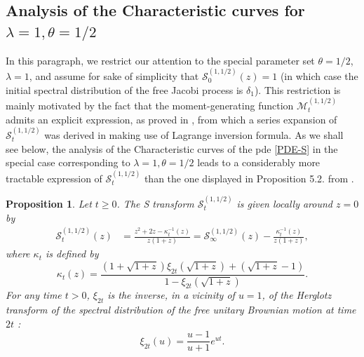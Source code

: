 \documentclass[12pt,reqno]{amsart}
\newtheorem{proposition}{Proposition}
\begin{document}
\subsection{Analysis of the Characteristic curves for \texorpdfstring{$\lambda = 1, \theta=1/2$}{}}
\label{ssec:charcurves}
In this paragraph, we restrict our attention to the special parameter set \(\theta = 1/2\), \(\lambda = 1\), and assume for sake of simplicity that $\mathcal{S}^{(1,1/2)}_0(z) =1$ (in which case the initial spectral distribution of the free Jacobi process is $\delta_1$). This restriction is mainly motivated by the fact that the moment-generating function $\mathcal{M}_t^{(1,1/2)}$
admits an explicit expression, as proved in \cite{MR3071702}, from which a series expansion of $\mathcal{S}_t^{(1,1/2)}$ was derived in \cite{MR3679612} making use of Lagrange inversion formula. 
As we shall see below, the analysis of the Characteristic curves of the pde \eqref{PDE-S} in the special case corresponding to $\lambda = 1, \theta=1/2$ leads to a considerably more tractable expression of 
$\mathcal{S}^{(1,1/2)}_t$ than the one displayed in Proposition 5.2. from \cite{MR3679612}. 
\begin{proposition}
	\label{prop:characteristics}
	Let $t\geq 0$. The S transform $\mathcal{S}_t^{(1,1/2)}$ is given locally around $z=0$ by
	\begin{align}
        \label{eqn:stransformunundemi}
		\mathcal{S}_t^{(1,1/2)}(z) & = \frac{z^2 + 2z - \kappa_t^{-1}(z)}{z(1+z)} = \mathcal{S}_{\infty}^{(1,1/2)}(z) - \frac{\kappa_t^{-1}(z)}{z(1+z)},
	\end{align}
	where $\kappa_t$ is defined by
	$$
		\kappa_t(z) = \frac{(1+\sqrt{1+z})\xi_{2t}(\sqrt{1+z}) + (\sqrt{1+z}-1)}{1-\xi_{2t}(\sqrt{1+z})}.
	$$
	For any time $t > 0$, $\xi_{2t}$ is the inverse, in a vicinity of $u=1$, of the Herglotz transform of the spectral distribution of the free unitary Brownian motion at time $2t$ \cite{MR1430721}:
	$$
		\xi_{2t}(u)=\frac{u-1}{u+1} e^{ut}.
	$$
\end{proposition}
\end{document}
